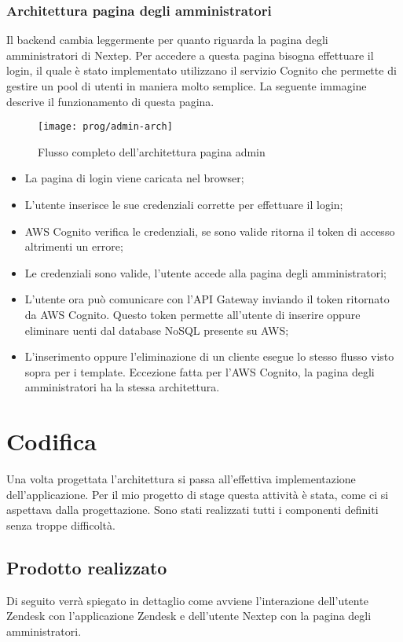 \subsubsection{Architettura pagina degli amministratori}
Il backend cambia leggermente per quanto riguarda la pagina degli amministratori di Nextep. Per accedere a questa pagina bisogna effettuare il login, il quale è stato implementato utilizzano il servizio Cognito che permette di gestire un pool di utenti in maniera molto semplice. La seguente immagine descrive il funzionamento di questa pagina. 
\begin{figure}[!h] 
	\centering 
	\texttt{[image: prog/admin-arch]} 
	\caption{Flusso completo dell'architettura pagina admin}
\end{figure} 
\begin{itemize}
	\item La pagina di login viene caricata nel browser;
	\item L'utente inserisce le sue credenziali corrette per effettuare il login;
	\item AWS Cognito verifica le credenziali, se sono valide ritorna il token di accesso altrimenti un errore;
	\item Le credenziali sono valide, l'utente accede alla pagina degli amministratori;
	\item L'utente ora può comunicare con l'API Gateway inviando il token ritornato da AWS Cognito. Questo token permette all'utente di inserire oppure eliminare uenti dal database NoSQL presente su AWS;
	\item L'inserimento oppure l'eliminazione di un cliente esegue lo stesso flusso visto sopra per i template. Eccezione fatta per l'AWS Cognito, la pagina degli amministratori ha la stessa architettura.
\end{itemize}
\newpage
\section{Codifica}

Una volta progettata l’architettura 
si passa all’effettiva implementazione dell'applicazione.
 Per il mio progetto di stage questa attività è stata, come ci si aspettava dalla
progettazione. Sono stati realizzati tutti i componenti definiti senza troppe difficoltà. 

\subsection{Prodotto realizzato}
\label{cap:progetto-terminato}
Di seguito verrà spiegato in dettaglio come avviene l’interazione dell'utente Zendesk con l'applicazione
Zendesk e dell'utente Nextep con la pagina degli amministratori.

